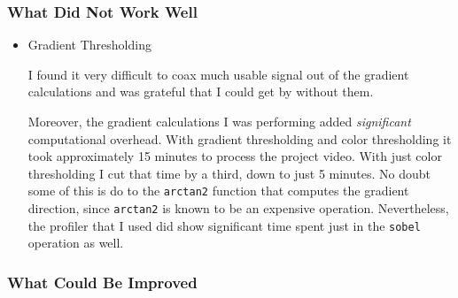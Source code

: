\documentclass[11pt]{article}
\begin{document}
\subsubsection*{What Did Not Work Well}
\label{sec-1-3-2}

\begin{itemize}
\item Gradient Thresholding
\label{sec-1-3-2-1}

I found it very difficult to coax much usable signal out of
the gradient calculations and was grateful that I could get by
without them.

Moreover, the gradient calculations I was performing added
\emph{significant} computational overhead.  With gradient
thresholding and color thresholding it took approximately 15
minutes to process the project video.  With just color
thresholding I cut that time by a third, down to just 5
minutes.  No doubt some of this is do to the \texttt{arctan2}
function that computes the gradient direction, since \texttt{arctan2}
is known to be an expensive operation.  Nevertheless, the
profiler that I used did show significant time spent just in
the \texttt{sobel} operation as well.
\end{itemize}

\subsubsection*{What Could Be Improved}
\label{sec-1-3-3}
\end{document}
